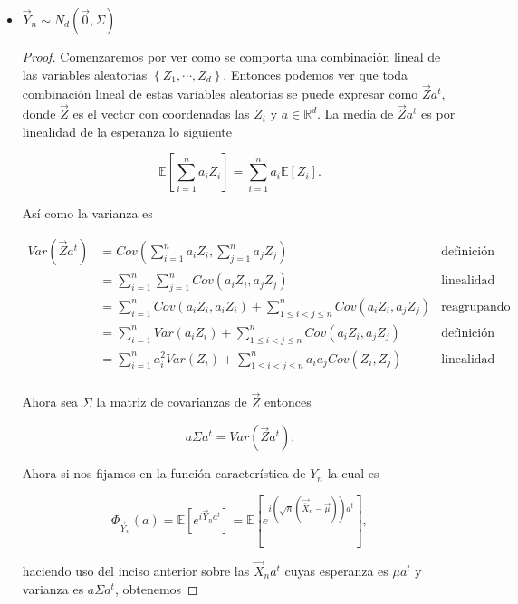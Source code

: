 \documentclass[letterpaper]{article}
\theoremstyle{definition}
\theoremstyle{lemathm}
\theoremstyle{lemademthm}
\newcommand{\pars}[1]{\left( #1 \right) }
\newcommand{\bracs}[1]{\left[ #1 \right] }
\newcommand{\set}[1]{\left \{ #1 \right\} }
\newcommand{\RR}{\mathbb{R}}
\newcommand{\EE}{\mathbb{E}}
\newcommand{\1}{\mathbbm{1}}
\begin{document}
\begin{enumerate}
\begin{itemize}
            \item $\vec{Y}_n\sim N_d\pars{\vec{0},\Sigma}$
            
            \begin{proof}
            
                Comenzaremos por ver como se comporta una combinación lineal de las variables aleatorias $\set{Z_1,\cdots,Z_d}$. Entonces podemos ver que toda combinación lineal de estas variables aleatorias se puede expresar como $\vec{Z}a^t$, donde $\vec{Z}$ es el vector con coordenadas las $Z_i$ y $a\in \RR^d$. La media de $\vec{Z}a^t$ es por linealidad de la esperanza lo siguiente
                
                \[\EE\bracs{\sum_{i=1}^{n} a_i Z_i} = \sum_{i=1}^{n}a_i\EE\bracs{Z_i}.\]
                
                Así como la varianza es
                
                \begin{align*}
                    Var\pars{\vec{Z}a^t} &= Cov(\sum_{i=1}^n a_i Z_i,\sum_{j=1}^n a_j Z_j) &\text{definición de varianza}\\
                    &= \sum_{i=1}^n\sum_{j=1}^n Cov(a_i Z_i,a_j Z_j) &\text{linealidad de la covarianza}\\
                    &= \sum_{i=1}^n Cov(a_i Z_i,a_i Z_i) + \sum_{1\leq i<j \leq n}^n Cov(a_i Z_i,a_j Z_j)&\text{reagrupando las sumas}\\
                    &= \sum_{i=1}^n Var(a_i Z_i) + \sum_{1\leq i<j \leq n}^n Cov(a_i Z_i,a_j Z_j)&\text{definición de varianza}\\
                    &= \sum_{i=1}^n a_i^2Var(Z_i) + \sum_{1\leq i<j \leq n}^n a_ia_jCov(Z_i, Z_j)&\text{linealidad de la var y la cov}\\
                \end{align*}
                
                Ahora sea $\Sigma$ la matriz de covarianzas de $\vec{Z}$ entonces
                
                \[a\Sigma a^t = Var(\vec{Z}a^t).\]
                
                Ahora si nos fijamos en la función característica de $Y_n$ la cual es
                
                \[\Phi_{\vec{Y}_n}\pars{a} = \EE\bracs{e^{i\vec{Y}_na^t}} = \EE\bracs{e^{i\pars{\sqrt{n}\pars{\vec{\overline{X}}_n-\vec{\mu}}}a^t}},\]
                
                haciendo uso del inciso anterior sobre las $\vec{X}_n a^t$ cuyas esperanza es $\mu a^t$ y varianza es  $a\Sigma a^t$, obtenemos
                

\end{proof}
\end{itemize}
\end{enumerate}
\end{document}
